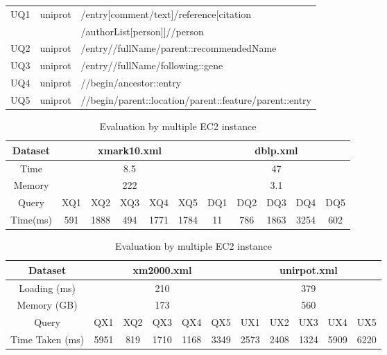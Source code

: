 \begin{table}
\begin{tabular}{c|c|l}
		\hline
		UQ1 & uniprot & /entry[comment/text]/reference[citation \\
		&&/authorList[person]]//person\\
		\hline
		UQ2 & uniprot & /entry//fullName/parent::recommendedName \\
		\hline
		UQ3 & uniprot & /entry//fullName/following::gene \\
		\hline
		UQ4 & uniprot & //begin/ancestor::entry\\
		\hline
		UQ5 & uniprot & //begin/parent::location/parent::feature/parent::entry \\
		\hline
	\end{tabular}
\end{table}


\begin{table}[t]
	\centering
	\caption{Evaluation by one EC2 instance}
	\label{tab:singeval}
	\begin{tabular}{c|c|c|c|c|c|c|c|c|c|c}
		\hline \hline
		Dataset  & \multicolumn{5}{c|}{xmark10.xml} & \multicolumn{5}{c}{dblp.xml} \\ \hline
		Time     & \multicolumn{5}{c|}{8.5}          & \multicolumn{5}{c}{47}       \\ \hline
		Memory   & \multicolumn{5}{c|}{222}          & \multicolumn{5}{c}{3.1}       \\ \hline
		Query    & XQ1  & XQ2   & XQ3 & XQ4  & XQ5  & DQ1 & DQ2 & DQ3  & DQ4  & DQ5 \\ \hline
		Time(ms) & 591  & 1888  & 494 & 1771 & 1784 & 11  & 786 & 1863 & 3254 & 602 \\ \hline
	\end{tabular}
	\vspace{10px}
	\caption{Evaluation by multiple EC2 instance}
	\centering
	\label{tab:multieval}
	\begin{tabular}{c|c|c|c|c|c|c|c|c|c|c}
		\hline \hline
		Dataset	&	\multicolumn{5}{|c|}{xm2000.xml}     & \multicolumn{5}{c}{unirpot.xml}       \\
		\hline
		Loading (ms)	&	\multicolumn{5}{|c|}{210}     & \multicolumn{5}{c}{379}       \\
		\hline
		Memory (GB)	&	\multicolumn{5}{|c|}{173}     & \multicolumn{5}{c}{560}       \\
		\hline
		Query	& QX1      & XQ2     & QX3      & QX4      & QX5      & UX1      & UX2      & UX3      & UX4      & UX5      \\
		\hline
		Time Taken (ms) & 5951 & 819 & 1710 & 1168 & 3349 & 2573 & 2408 & 1324 & 5909 & 6220\\
		\hline
	\end{tabular}
\end{table} 

